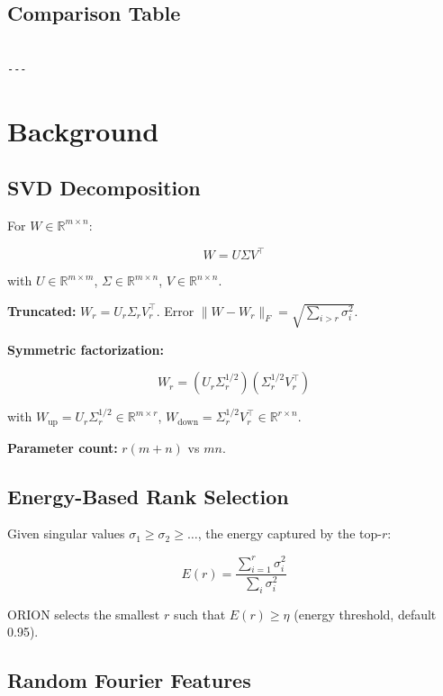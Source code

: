 \subsection{Comparison Table}

\begin{lstlisting}

---
\end{lstlisting}


\section{Background}

\subsection{SVD Decomposition}

For $W \in \mathbb{R}^{m \times n}$:

\[
W = U \Sigma V^\top
\tag{3.1}
\]

with $U \in \mathbb{R}^{m \times m}$, $\Sigma \in \mathbb{R}^{m \times n}$, 
$V \in \mathbb{R}^{n \times n}$.

\textbf{Truncated:} $W_r = U_r \Sigma_r V_r^\top$. Error $\|W - W_r\|_F = \sqrt{\sum_{i > r} \sigma_i^2}$.

\textbf{Symmetric factorization:}

\[
W_r = (U_r \Sigma_r^{1/2})(\Sigma_r^{1/2} V_r^\top)
\tag{3.2}
\]

with $W_\text{up} = U_r \Sigma_r^{1/2} \in \mathbb{R}^{m \times r}$, 
$W_\text{down} = \Sigma_r^{1/2} V_r^\top \in \mathbb{R}^{r \times n}$.

\textbf{Parameter count:} $r(m + n)$ vs $mn$.

\subsection{Energy-Based Rank Selection}

Given singular values $\sigma_1 \geq \sigma_2 \geq \dots$, the energy 
captured by the top-$r$:

\[
E(r) = \frac{\sum_{i=1}^{r} \sigma_i^2}{\sum_i \sigma_i^2}
\tag{3.3}
\]

ORION selects the smallest $r$ such that $E(r) \geq \eta$ (energy threshold, 
default 0.95).

\subsection{Random Fourier Features}

